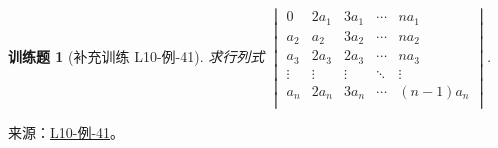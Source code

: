 \documentclass[12pt,fontset=fandol]{ctexart}
\newtheorem{exercise}{训练题}[section]
\begin{document}
\begin{exercise}[补充训练 L10-例-41]\label{prob:L10-例-41}
求行列式 $\begin{vmatrix}
                    0      & 2a_1   & 3a_1   & \cdots & na_1     \\
                    a_2    & a_2    & 3a_2   & \cdots & na_2     \\
                    a_3    & 2a_3   & 2a_3   & \cdots & na_3     \\
                    \vdots & \vdots & \vdots & \ddots & \vdots   \\
                    a_n    & 2a_n   & 3a_n   & \cdots & (n-1)a_n \\
                \end{vmatrix}$.
\end{exercise}
\noindent 来源：\href{https://github.com/yhwu-is/Linear-Algebra-Left-Undone/blob/new/%E8%AE%B2%E4%B9%89/%E4%B8%93%E9%A2%98/10%20%E8%A1%8C%E5%88%97%E5%BC%8F.tex}{L10-例-41}。
\end{document}
